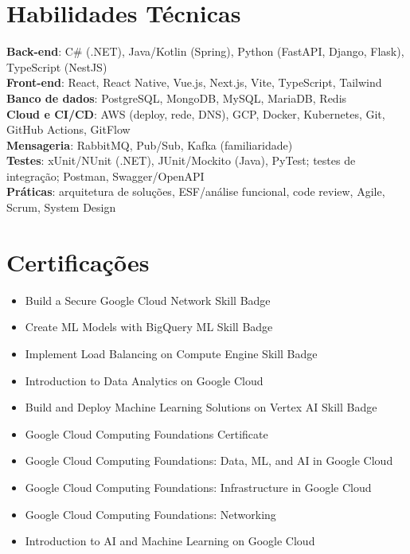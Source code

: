 \documentclass[letterpaper,11pt]{article}
\newcommand{\resumeItem}[1]{
  \item\small{
    {#1 \vspace{-2pt}}
  }
}
\newcommand{\resumeSubHeadingListStart}{\begin{itemize}[leftmargin=0.0in, label={}]}
\newcommand{\resumeSubHeadingListEnd}{\end{itemize}}
\begin{document}
\section{Habilidades Técnicas}
 \begin{itemize}[leftmargin=0.15in, label={}]
    \small{\item{
     \textbf{Back-end}{: C\# (.NET), Java/Kotlin (Spring), Python (FastAPI, Django, Flask), TypeScript (NestJS)} \\
     \textbf{Front-end}{: React, React Native, Vue.js, Next.js, Vite, TypeScript, Tailwind} \\
     \textbf{Banco de dados}{: PostgreSQL, MongoDB, MySQL, MariaDB, Redis} \\
     \textbf{Cloud e CI/CD}{: AWS (deploy, rede, DNS), GCP, Docker, Kubernetes, Git, GitHub Actions, GitFlow} \\
     \textbf{Mensageria}{: RabbitMQ, Pub/Sub, Kafka (familiaridade)} \\
     \textbf{Testes}{: xUnit/NUnit (.NET), JUnit/Mockito (Java), PyTest; testes de integração; Postman, Swagger/OpenAPI} \\
     \textbf{Práticas}{: arquitetura de soluções, ESF/análise funcional, code review, Agile, Scrum, System Design} \\
    }}
 \end{itemize}
 \vspace{-10pt}

\section{Certificações}
  \resumeSubHeadingListStart
    \begin{itemize}[leftmargin=0.15in, label={}]
        \resumeItem{Build a Secure Google Cloud Network Skill Badge}
        \resumeItem{Create ML Models with BigQuery ML Skill Badge}
        \resumeItem{Implement Load Balancing on Compute Engine Skill Badge}
        \resumeItem{Introduction to Data Analytics on Google Cloud}
        \resumeItem{Build and Deploy Machine Learning Solutions on Vertex AI Skill Badge}
        \resumeItem{Google Cloud Computing Foundations Certificate}
        \resumeItem{Google Cloud Computing Foundations: Data, ML, and AI in Google Cloud}
        \resumeItem{Google Cloud Computing Foundations: Infrastructure in Google Cloud}
        \resumeItem{Google Cloud Computing Foundations: Networking}
        \resumeItem{Introduction to AI and Machine Learning on Google Cloud}
    \end{itemize}
  \resumeSubHeadingListEnd
\vspace{-10pt}
\end{document}
